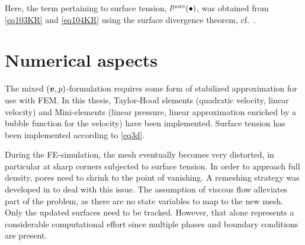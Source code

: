 \documentclass[MikaelDissertation.tex]{subfiles}
\begin{document}
Here, the term pertaining to surface tension, $l^{\mathrm{pore}}(\bullet)$, was obtained from \cref{eq103KR} and \cref{eq104KR} using the surface divergence theorem, cf.\ .

\section{Numerical aspects}
The mixed $(\boldsymbol{v},p)$-formulation requires some form of stabilized approximation for use with FEM.
In this thesis, Taylor-Hood elements (quadratic velocity, linear velocity) and Mini-elements (linear pressure, linear approximation enriched by a bubble function for the velocity) have been implemented.
Surface tension has been implemented according to \cref{eq3d}.

During the FE-simulation, the mesh eventually becomes very distorted, in particular at sharp corners subjected to surface tension.
In order to approach full density, pores need to shrink to the point of vanishing. 
A remeshing strategy was developed in  to deal with this issue.
The assumption of viscous flow alleviates part of the problem, as there are no state variables to map to the new mesh.
Only the updated surfaces need to be tracked.
However, that alone represents a considerable computational effort since multiple phases and boundary conditions are present.
\end{document}
